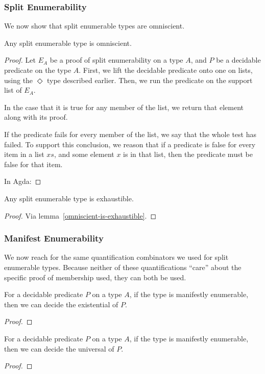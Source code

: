 \subsubsection{Split Enumerability}
We now show that split enumerable types are omniscient.
\begin{theorem}
  Any split enumerable type is omniscient.
\end{theorem}
\begin{proof}
  Let \(E_A\) be a proof of split enumerability on a type \(A\), and \(P\) be a
  decidable predicate on the type \(A\).
  First, we lift the decidable predicate onto one on lists, using the
  \(\Diamond\) type described earlier.
  Then, we run the predicate on the support list of \(E_A\).

  In the case that it is true for any member of the list, we return that element
  along with its proof.

  If the predicate fails for every member of the list, we say that the whole
  test has failed.
  To support this conclusion, we reason that if a predicate is false for every
  item in a list \(\mathit{xs}\), and some element \(x\) is in that list, then
  the predicate must be false for that item.

  In Agda:
\end{proof}
\begin{theorem}
  Any split enumerable type is exhaustible.
\end{theorem}
\begin{proof}
  Via lemma~\ref{omniscient-is-exhaustible}.
\end{proof}

\subsubsection{Manifest Enumerability}
We now reach for the same quantification combinators we used for
split enumerable types.
Because neither of these quantifications ``care'' about the specific proof of
membership used, they can both be used.
\begin{theorem}
  For a decidable predicate \(P\) on a type \(A\), if the type is manifestly
  enumerable, then we can decide the existential of \(P\).
\end{theorem}
\begin{proof}
\end{proof}

\begin{theorem}
  For a decidable predicate \(P\) on a type \(A\), if the type is manifestly
  enumerable, then we can decide the universal of \(P\).
\end{theorem}
\begin{proof}
\end{proof}

